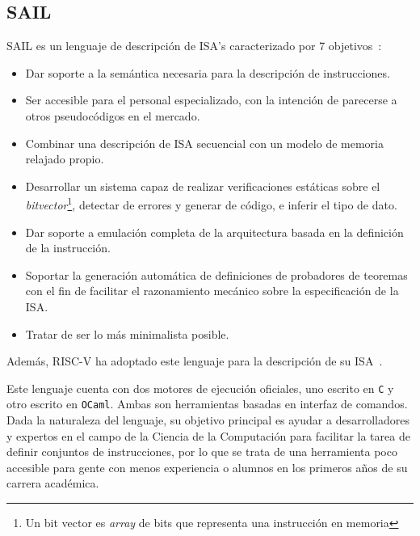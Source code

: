 \subsection{SAIL}

SAIL es un lenguaje de descripción de ISA's caracterizado por 7 objetivos~\cite{sail}: 
\begin{itemize}
    \item Dar soporte a la semántica necesaria para la descripción de instrucciones.
    \item Ser accesible para el personal especializado, con la intención de
    parecerse a otros pseudocódigos en el mercado.
    \item Combinar una descripción de ISA secuencial con un modelo de memoria relajado propio.
    \item Desarrollar un sistema capaz de realizar verificaciones estáticas
    sobre el \textit{bitvector}\footnote{Un bit vector es \textit{array} de
    bits que representa una instrucción en memoria}, detectar de errores y
    generar de código, e inferir el tipo de dato.
    \item Dar soporte a emulación completa de la arquitectura basada en la definición de la instrucción.
    \item Soportar la generación automática de definiciones de probadores de
    teoremas con el fin de facilitar el razonamiento mecánico sobre la
    especificación de la ISA\@.
    \item Tratar de ser lo más minimalista posible.
\end{itemize}

Además, RISC-V ha adoptado este lenguaje para la descripción de su
ISA~\cite{sail-riscv}.

Este lenguaje cuenta con dos motores de ejecución oficiales, uno escrito en
\texttt{C} y otro escrito en \texttt{OCaml}. Ambas son herramientas basadas en
interfaz de comandos. Dada la naturaleza del lenguaje, su objetivo principal es
ayudar a desarrolladores y expertos en el campo de la Ciencia de la
Computación para facilitar la tarea de definir conjuntos de
instrucciones, por lo que se trata de una herramienta poco accesible para gente
con menos experiencia o alumnos en los primeros años de su carrera académica.

